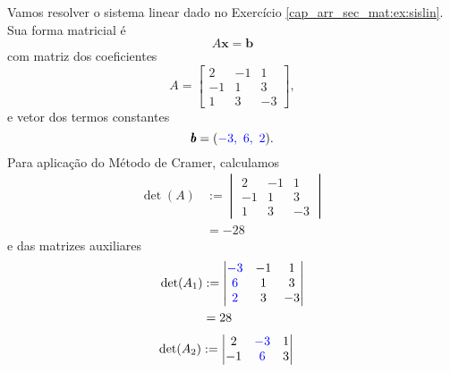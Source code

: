 \begin{ex}
  Vamos resolver o sistema linear dado no Exercício \ref{cap_arr_sec_mat:ex:sislin}. Sua forma matricial é
  \begin{equation}
    A\pmb{x} = \pmb{b}
  \end{equation}
  com matriz dos coeficientes
  \begin{equation}
        A =
    \begin{bmatrix}
      2 & -1 & 1\\
      -1 & 1 & 3\\
      1 & 3 & -3
    \end{bmatrix},
  \end{equation}
  e vetor dos termos constantes
  \begin{equation}
    \pmb{b} = ({\color{blue}-3, ~6, ~2}).
  \end{equation}
  Para aplicação do Método de Cramer, calculamos
  \begin{subequations}
    \begin{align}
      \det(A) &:=
                \begin{vmatrix}
                  2 & -1 & 1\\
                  -1 & 1 & 3\\
                  1 & 3 & -3
                \end{vmatrix}\\
              &= -28
    \end{align}
  \end{subequations}    
  e das matrizes auxiliares
  \begin{subequations}
    \begin{align}
      \det(A_1) &:=
                \begin{vmatrix}
                  {\color{blue}-3} & -1 & 1\\
                  {\color{blue}6} & 1 & 3\\
                  {\color{blue}2} & 3 & -3
                \end{vmatrix}\\
              &= 28
    \end{align}
  \end{subequations}
  \begin{subequations}
    \begin{align}
      \det(A_2) &:=
                \begin{vmatrix}
                  2 & {\color{blue}-3} & 1\\
                  -1 & {\color{blue}6} & 3\\

\end{vmatrix}
\end{align}
\end{subequations}
\end{ex}
